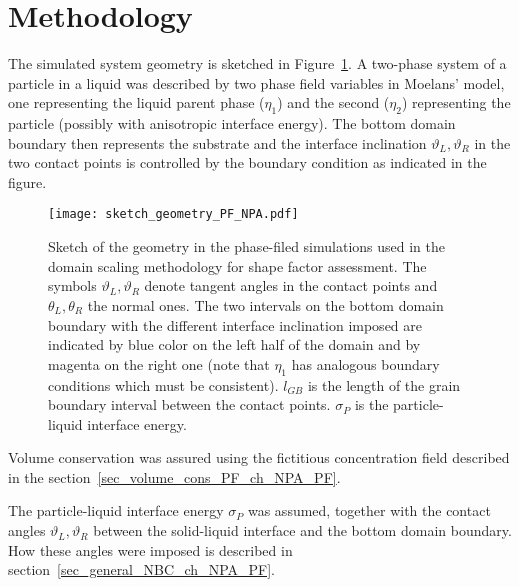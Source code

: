 \section{Methodology}
The simulated system geometry is sketched in Figure~\ref{fig_sketch_domain_scaling_PF}. A two-phase system of a particle in a liquid was described by two phase field variables in Moelans' model, one representing the liquid parent phase ($\eta_1$) and the second ($\eta_2$) representing the particle (possibly with anisotropic interface energy). The bottom domain boundary then represents the substrate and the interface inclination $\vartheta_L,\vartheta_R$ in the two contact points is controlled by the boundary condition as indicated in the figure.
\begin{figure}
	\centering
	\texttt{[image: sketch\_geometry\_PF\_NPA.pdf]}
	\caption[Sketch - PF simulation domain geometry to obtain equilibrium stable shape of a particle on a plane]{Sketch of the geometry in the phase-filed simulations used in the domain scaling methodology for shape factor assessment. The symbols $\vartheta_L,\vartheta_R$ denote tangent angles in the contact points and $\theta_L,\theta_R$ the normal ones. The two intervals on the bottom domain boundary with the different interface inclination imposed are indicated  by blue color on the left half of the domain and by magenta on the right one (note that $\eta_1$ has analogous boundary conditions which must be consistent). $l_{GB}$ is the length of the grain boundary interval between the contact points. $\sigma_P$ is the particle-liquid interface energy.}
	\label{fig_sketch_domain_scaling_PF}
\end{figure}

Volume conservation was assured using the fictitious concentration field described in the section~\ref{sec_volume_cons_PF_ch_NPA_PF}. 

The particle-liquid interface energy $\sigma_P$ was assumed, together with the contact angles $\vartheta_L, \vartheta_R$ between the solid-liquid interface and the bottom domain boundary. How these angles were imposed is described in section~\ref{sec_general_NBC_ch_NPA_PF}.

